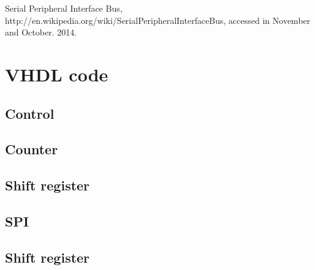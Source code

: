 \documentclass[11pt,twoside,a4paper]{article}
\begin{document}
\begin{thebibliography}{3}
Serial Peripheral Interface Bus, 
http://en.wikipedia.org/wiki/Serial\textunderscore Peripheral\textunderscore Interface\textunderscore Bus,
accessed in November and October. 2014.
\end{thebibliography}

\section{VHDL code}
\subsection{Control}
\label{control-vhdl}
 
\subsection{Counter}
\label{counter-vhdl}
 
\subsection{Shift register}
\label{shift-reg-vhdl}
 
\subsection{SPI}
\label{spi-vhdl}
 
\subsection{Shift register}
\label{spi-tb-vhdl}
 
\end{document}
